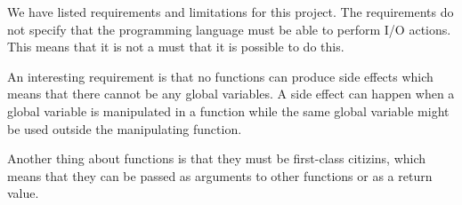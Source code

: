 We have listed requirements and limitations for this project. The requirements
do not specify that the programming language must be able to perform I/O
actions. This means that it is not a must that it is possible to do this.

An interesting requirement is that no functions can produce side effects which
means that there cannot be any global variables. A side effect can happen when a
global variable is manipulated in a function while the same global variable
might be used outside the manipulating function. 

Another thing about functions is that they must be first-class citizins, which
means that they can be passed as arguments to other functions or as a return
value.

